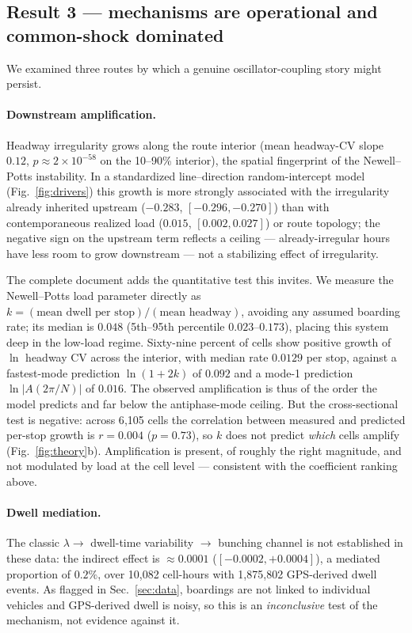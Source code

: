 \documentclass[9pt,twocolumn,twoside]{opticajnl}
\begin{document}
\subsection{Result 3 --- mechanisms are operational and common-shock
dominated}\label{sec:mechanisms}

We examined three routes by which a genuine oscillator-coupling story might persist.

\paragraph{Downstream amplification.} Headway irregularity grows along the route interior (mean
headway-CV slope $0.12$, $p \approx 2\times10^{-58}$ on the 10--90\% interior), the spatial
fingerprint of the Newell--Potts instability. In a standardized line--direction random-intercept
model (Fig.~\ref{fig:drivers}) this growth is more strongly associated with the irregularity
already inherited upstream ($-0.283$, $[-0.296,-0.270]$) than with contemporaneous realized load
($0.015$, $[0.002,0.027]$) or route topology; the negative sign on the upstream term reflects a
ceiling --- already-irregular hours have less room to grow downstream --- not a stabilizing
effect of irregularity.

The complete document adds the quantitative test this invites. We measure the Newell--Potts load
parameter directly as $k = (\text{mean dwell per stop})/(\text{mean headway})$, avoiding any
assumed boarding rate; its median is $0.048$ (5th--95th percentile $0.023$--$0.173$), placing
this system deep in the low-load regime. Sixty-nine percent of cells show positive growth of
$\ln$ headway CV across the interior, with median rate $0.0129$ per stop, against a
fastest-mode prediction $\ln(1+2k)$ of $0.092$ and a mode-1 prediction $\ln|A(2\pi/N)|$ of
$0.016$. The observed amplification is thus of the order the model predicts and far below the
antiphase-mode ceiling. But the cross-sectional test is negative: across 6{,}105 cells the
correlation between measured and predicted per-stop growth is $r = 0.004$ ($p = 0.73$), so $k$
does not predict \emph{which} cells amplify (Fig.~\ref{fig:theory}b). Amplification is present,
of roughly the right magnitude, and not modulated by load at the cell level --- consistent with
the coefficient ranking above.

\paragraph{Dwell mediation.} The classic $\lambda \to$ dwell-time variability $\to$ bunching
channel is not established in these data: the indirect effect is $\approx 0.0001$
($[-0.0002, +0.0004]$), a mediated proportion of $0.2\%$, over 10{,}082 cell-hours with
1{,}875{,}802 GPS-derived dwell events. As flagged in Sec.~\ref{sec:data}, boardings are not
linked to individual vehicles and GPS-derived dwell is noisy, so this is an
\emph{inconclusive} test of the mechanism, not evidence against it.
\end{document}

